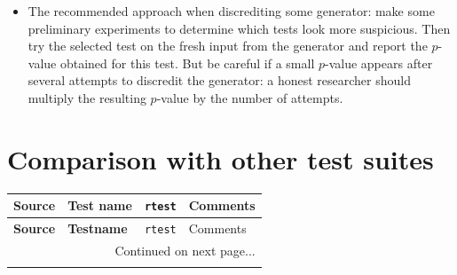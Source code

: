 \documentclass[12pt,a4paper,fullpage]{article}
\begin{document}
\begin{itemize}
\item The recommended approach when discrediting some generator: make some preliminary experiments to determine which tests look more suspicious. Then try the selected test on the fresh input from the generator and report the $p$-value obtained for this test. But be careful if a small $p$-value appears after several attempts to discredit the generator: a honest researcher should multiply the resulting $p$-value by the number of attempts.

\end{itemize}

\section{Comparison with other test suites}

\begin{longtable}{|c|>{\raggedright\arraybackslash}p{3cm}|l|>{\raggedright\arraybackslash}p{4cm}|}
\hline
\textbf{Source} & \textbf{Test name} & \texttt{rtest}  & Comments\\
\hline
\endfirsthead

\hline
\textbf{Source} & \textbf{Testname} & \texttt{rtest} & Comments\\
\hline
\endhead

\hline
\multicolumn{4}{|r|}{{Continued on next page...}} \\
\hline
\endfoot

\hline
\endlastfoot


\end{longtable}
\end{document}
